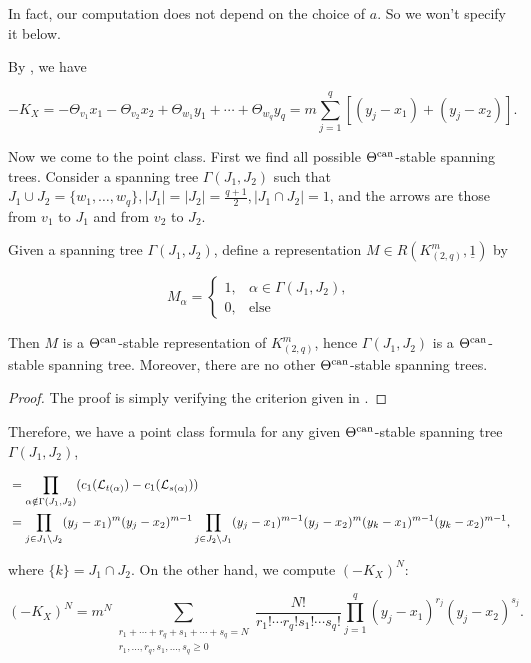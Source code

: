 \documentclass[11pt]{article}
\begin{document}
In fact, our computation does not depend on the choice of \(a\). So we won't specify it below. 

By , we have 

\[
-K_X = -\Theta_{v_1}x_1 - \Theta_{v_2}x_2 + \Theta_{w_1}y_1 + \cdots + \Theta_{w_q}y_q = m\sum_{j = 1}^q[(y_j - x_1) + (y_j - x_2)].
\]

Now we come to the point class. First we find all possible \(\Theta^{\text{can}}\)-stable spanning trees. Consider a spanning tree \(\Gamma(J_1, J_2)\) such that \(J_1\cup J_2 = \{w_1, \dots, w_q\}, |J_1| = |J_2| = \frac{q+1}{2}, |J_1\cap J_2| = 1\), and the arrows are those from \(v_1\) to \(J_1\) and from \(v_2\) to \(J_2\). 

\begin{lemma}
    Given a spanning tree \(\Gamma(J_1, J_2)\), define a representation \(M\in R(K_{(2, q)}^m, \underline{1})\) by 

    \[
    M_{\alpha} = \begin{cases}
        1, & \alpha\in \Gamma(J_1, J_2),\\ 
        0, & \text{else}
    \end{cases}
    \]

    Then \(M\) is a \(\Theta^{\text{can}}\)-stable representation of \(K_{(2, q)}^m\), hence \(\Gamma(J_1, J_2)\) is a \(\Theta^{\text{can}}\)-stable spanning tree. Moreover, there are no other \(\Theta^{\text{can}}\)-stable spanning trees. 
\end{lemma}

\begin{proof}
    The proof is simply verifying the criterion given in \cite[Lemma 19]{franzen2015chow}. 
\end{proof}

Therefore, we have a point class formula for any given \(\Theta^{\text{can}}\)-stable spanning tree \(\Gamma(J_1, J_2)\),

\begin{align}
    [pt] &= \prod_{\alpha\notin \Gamma(J_1, J_2)}(c_1(\mathcal{L}_{t(\alpha)}) - c_1(\mathcal{L}_{s(\alpha)}))\notag\\ 
    &= \prod_{j\in J_1\backslash J_2}(y_j - x_1)^m(y_j - x_2)^{m-1}\prod_{j\in J_2\backslash J_1}(y_j - x_1)^{m-1}(y_j - x_2)^m (y_k - x_1)^{m-1}(y_k - x_2)^{m-1},\label{Equation:k2qm-pt}
\end{align}

where \(\{k\} = J_1\cap J_2\). On the other hand, we compute \((-K_X)^N\):

\[
(-K_X)^{N} = m^N\sum_{\substack{r_1 + \cdots + r_q + s_1 + \cdots + s_q = N\\ r_1, \dots, r_q, s_1, \dots, s_q\geq 0}}\frac{N!}{r_1!\cdots r_q!s_1!\cdots s_q!}\prod_{j = 1}^q(y_j - x_1)^{r_j}(y_j - x_2)^{s_j}.
\]
\end{document}
